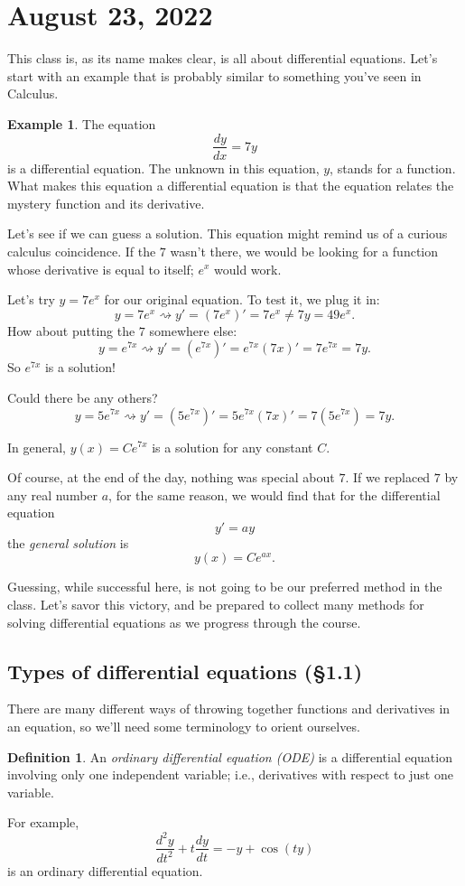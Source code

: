 \documentclass[12pt]{amsart}
\numberwithin{equation}{section}
\theoremstyle{plain} %
\newcommand{\Aug}[1]{\section{August #1, 2022}}
\newcommand{\rsa}{\rightsquigarrow}
\theoremstyle{definition}
\newtheorem{defn}[equation]{Definition}
\newtheorem{ex}[equation]{Example}
\theoremstyle{remark}
\begin{document}
\setcounter{tocdepth}{1}
\tableofcontents


\Aug{23}

This class is, as its name makes clear, is all about differential equations. Let's start with an example that is probably similar to something you've seen in Calculus.

\begin{ex}
The equation
\[ \frac{dy}{dx} = 7 y\]
is a differential equation. The unknown in this equation, $y$, stands for a function. What makes this equation a differential equation is that the equation relates the mystery function and its derivative.

Let's see if we can guess a solution. This equation might remind us of a curious calculus coincidence. If the $7$ wasn't there, we would be looking for a function whose derivative is equal to itself; $e^x$ would work. 

Let's try $y=7e^x$ for our original equation. To test it, we plug it in:
\[ y = 7 e^x \rsa y' = (7e^x)' = 7e^x \neq 7y = 49e^x.\]
How about putting the $7$ somewhere else:
\[  y = e^{7x} \rsa y' = (e^{7x})' = e^{7x} (7x)' = 7 e^{7x} = 7y.\]
So $e^{7x}$ is a solution!

Could there be any others?
\[  y = 5e^{7x} \rsa y' = (5e^{7x})' = 5e^{7x} (7x)' = 7 (5e^{7x}) = 7y.\]

In general, $y(x) = C e^{7x}$ is a solution for any constant $C$.
\end{ex}

Of course, at the end of the day, nothing was special about $7$. If we replaced $7$ by any real number $a$, for the same reason, we would find that for the differential equation
\[ y' = ay\]
the \emph{general solution} is
\[ y(x) = C e^{ax}.\]

Guessing, while successful here, is not going to be our preferred method in the class. Let's savor this victory, and be prepared to collect many methods for solving differential equations as we progress through the course.

\subsection*{Types of differential equations (\S1.1)}
There are many different ways of throwing together functions and derivatives in an equation, so we'll need some terminology to orient ourselves.

\begin{defn} An \emph{ordinary differential equation (ODE)} is a differential equation involving only one independent variable; i.e., derivatives with respect to just one variable.
\end{defn}
 For example,
 \[ \frac{d^2 y}{dt^2} + t \frac{dy}{dt} = -y + \cos(ty)\]
 is an ordinary differential equation.
 
\end{document}
